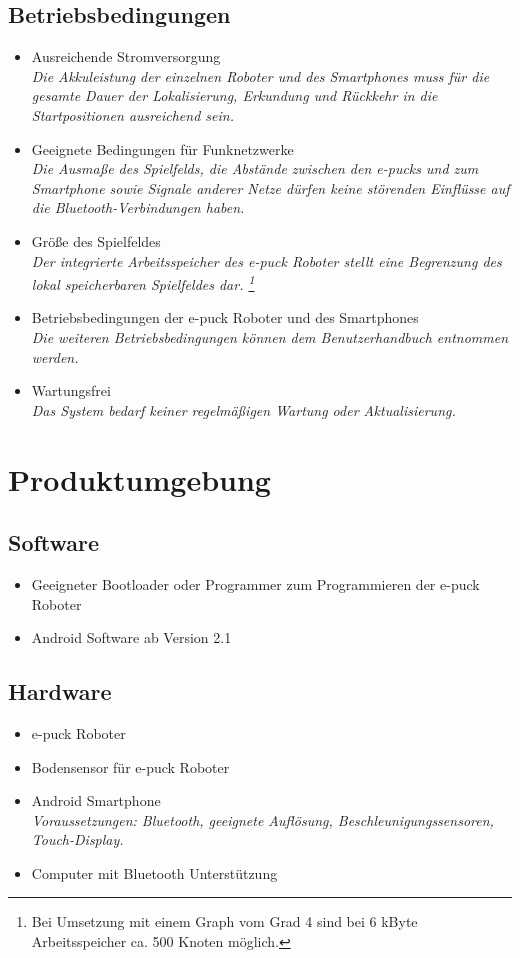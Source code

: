 \documentclass[10pt,a4paper]{article}
\let\oldsection\section
\renewcommand{\section}{\newpage \oldsection}
\begin{document}
		\subsection{Betriebsbedingungen}
			\begin{itemize}
				\item Ausreichende Stromversorgung
					\\ \textsl{Die Akkuleistung der einzelnen Roboter und des Smartphones muss für die gesamte
						Dauer der Lokalisierung, Erkundung und Rückkehr in die Startpositionen ausreichend sein.}
				\item Geeignete Bedingungen für Funknetzwerke
					\\ \textsl{Die Ausmaße des Spielfelds, die Abstände zwischen den e-pucks und zum Smartphone sowie
						Signale anderer Netze dürfen keine störenden Einflüsse auf die Bluetooth-Verbindungen haben.}
				\item Größe des Spielfeldes
					\\ \textsl{Der integrierte Arbeitsspeicher des e-puck Roboter stellt eine Begrenzung des lokal
					 speicherbaren Spielfeldes dar. \footnote{Bei Umsetzung mit einem Graph vom Grad 4 sind bei 6 kByte Arbeitsspeicher
					 	ca. 500 Knoten möglich.} }
				\item Betriebsbedingungen der e-puck Roboter und des Smartphones
					\\ \textsl{Die weiteren Betriebsbedingungen können dem Benutzerhandbuch entnommen werden.}			
				\item Wartungsfrei
					\\ \textsl{Das System bedarf keiner regelmäßigen Wartung oder Aktualisierung.}		
			\end{itemize}
	\section{Produktumgebung}
		\subsection{Software}
			\begin{itemize}
				\item Geeigneter Bootloader oder Programmer zum Programmieren der e-puck Roboter
				\item Android Software ab Version 2.1
			\end{itemize}
		\subsection{Hardware}
			\begin{itemize}
				\item e-puck Roboter
				\item Bodensensor für e-puck Roboter
				\item Android Smartphone
					\\ \textsl{Voraussetzungen: Bluetooth, geeignete Auflösung, Beschleunigungssensoren, Touch-Display.}
				\item Computer mit Bluetooth Unterstützung
			\end{itemize}		
\end{document}
